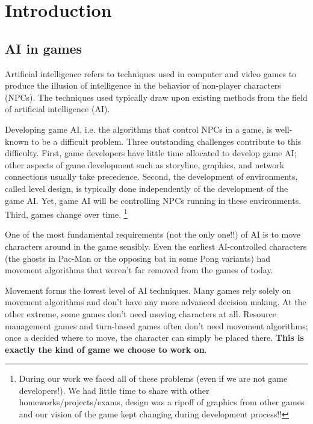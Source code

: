\chapter{Introduction}

\section{AI in games}

Artificial intelligence refers to techniques used in computer and video games to produce the illusion of intelligence in the behavior of non-player characters (NPCs). The techniques used typically draw upon existing methods from the field of artificial intelligence (AI).

Developing game AI, i.e. the algorithms that control NPCs in a game, is well-known to be a difficult problem. Three outstanding challenges contribute to this difficulty. 
First, game developers have little time allocated to develop game AI; other aspects of game development such as storyline, graphics, and network connections usually take precedence. Second, the development of environments, called level design, is typically done independently of the development of the game AI. Yet, game AI will be controlling NPCs running in these environments. Third, games change over time.
\footnote{During our work we faced all of these problems (even if we are not game developers!). We had little time to share with other homeworks/projects/exams, design was a ripoff of graphics from other games and our vision of the game kept changing during development process!!}

One of the most fundamental requirements (not the only one!!) of AI is to move characters around in the game sensibly. Even the earliest AI-controlled characters (the ghosts in Pac-Man or the opposing bat in some Pong variants) had movement algorithms that weren't far removed from the games of today.

Movement forms the lowest level of AI techniques. Many games rely solely on movement algorithms and don't have any more advanced decision making. At the other extreme, some games don't need moving characters at all. Resource management games and turn-based games often don't need movement algorithms; once a decided where to move, the character can simply be placed there.
\textbf{This is exactly the kind of game we choose to work on}.

